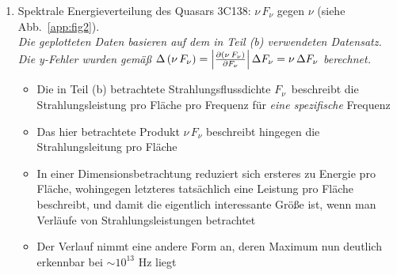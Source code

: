 \documentclass[11pt,a4paper]{scrartcl}
\newcommand*{\figref}[1]{(siehe Abb.~\ref{#1})}
\newcommand{\Fnu}{\ensuremath{{F}_{\nu}}}
\begin{document}
\begin{enumerate}[label=\textbf{\large(\alph*)}]
\vspace*{\baselineskip}

\item
Spektrale Energieverteilung des Quasars 3C138: $\nu\,\Fnu$
gegen $\nu$ \figref{app:fig2}. \\
\textit{\small Die geplotteten Daten basieren auf dem in Teil (b)
    verwendeten Datensatz. Die y-Fehler wurden gemäß
    $\Delta\left(\nu\,\Fnu\right) = \abs{\pdv{(\nu\,\Fnu)}{\Fnu}}\,\Delta\Fnu =
    \nu\,\Delta\Fnu$ berechnet.}

    \begin{itemize}
        \item Die in Teil (b) betrachtete Strahlungsflussdichte
            \Fnu~beschreibt die Strahlungsleistung pro Fläche
            pro Frequenz für \emph{eine spezifische} Frequenz
        \item Das hier betrachtete Produkt $\nu\,\Fnu$
            beschreibt hingegen die Strahlungsleitung pro Fläche
        \item In einer Dimensionsbetrachtung reduziert sich ersteres zu
            Energie pro Fläche, wohingegen letzteres tatsächlich eine Leistung
            pro Fläche beschreibt, und damit die eigentlich interessante Größe
            ist, wenn man Verläufe von Strahlungsleistungen betrachtet
        \item Der Verlauf nimmt eine andere Form an, deren Maximum nun
            deutlich erkennbar bei $\sim 10^{13}$ \si{\hertz} liegt
    \end{itemize}

\end{enumerate}

\newpage


\end{document}
